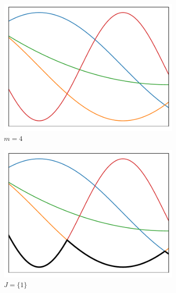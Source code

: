 \begin{figure}[H]
     \centering
     \begin{subfigure}{0.32\textwidth}
         \centering
         \includegraphics[width=\textwidth]{pictures/scenarios.pdf}
         \caption{$m=4$}
         \label{fig:scenarios}
     \end{subfigure}
     \hfill
     \begin{subfigure}{0.32\textwidth}
         \centering
         \includegraphics[width=\textwidth]{pictures/minimin.pdf}
         \caption{$J=\{1\}$}
         \label{fig:minimin}
     \end{subfigure}
     \hfill
     \begin{subfigure}{0.32\textwidth}

\end{subfigure}
\end{figure}
